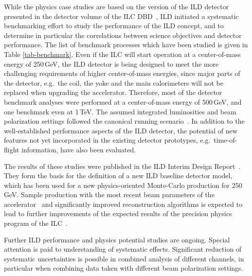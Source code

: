 While the physics case studies are based on the version of the ILD detector presented in the detector volume of the ILC DBD~\cite{ild-dbd}, ILD  initiated a systematic benchmarking effort to study the performance of the ILD concept, and to determine in particular the correlations between science objectives and detector performance. The list of benchmark   {processes} which   {have been studied} is given in Table \ref{tab-benchmark}. Even if the ILC will start operation at a center-of-mass energy of 250\,GeV, the ILD detector is being designed to meet the more challenging requirements of higher center-of-mass energies, since major parts of the detector, e.g.\ the coil, the yoke and the main calorimeters will not be replaced when upgrading the accelerator. Therefore, most of the detector benchmark analyses   {were} performed at a center-of-mass energy of 500\,GeV, and one benchmark even at 1\,TeV. The assumed integrated luminosities and beam polarization settings   {followed} the canonical running scenario~\cite{Barklow:2015tja}. 
In addition to the well-established performance aspects of the ILD detector, the potential of new features not yet incorporated in the existing detector prototypes, e.g.\ time-of-flight information,   {have also been} evaluated. 

The results of these studies   {were} published in the ILD Interim Design Report~\cite{ILDConceptGroup:2020sfq}. They form the basis for the definition of a new ILD baseline detector model, which   {has been} used for a new physics-oriented Monte-Carlo production for 250\,GeV.   {Sample production with} the most recent beam parameters of the accelerator~\cite{Evans:2017rvt} and significantly improved reconstruction algorithms is expected to lead to further improvements of the expected results of the precision physics program of the ILC~\cite{ILCESU1}.

  {Further ILD performance and physics potential studies are ongoing. Special attention is paid to understanding of systematic effects.
Significant reduction of systematic uncertainties is possible in combined analysis of different channels, in particular when combining data taken with different beam polarization settings. 
}

